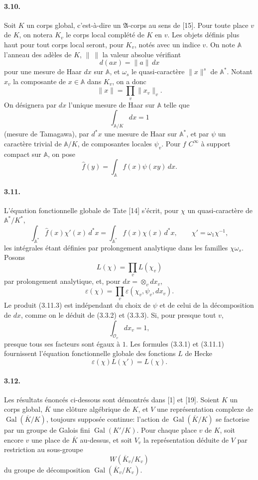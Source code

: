 \documentclass[10pt]{article}
\newcommand{\Gal}{\operatorname{Gal}}
\begin{document}
\paragraph{3.10.} Soit \(K\) un corps global, c'est-à-dire un \(\mathfrak A\)-corps au sens de [15]. Pour toute place \(v\) de \(K\), on notera \(K_v\) le corps local complété de \(K\) en \(v\). Les objets définis plus haut pour tout corps local seront, pour \(K_v\), notés avec un indice \(v\). On note \(\mathbb A\) l'anneau des adèles de \(K\), \(\|\ \|\) la valeur absolue vérifiant
\[
d(ax)=\|a\|\,dx
\]
pour une mesure de Haar \(dx\) sur \(\mathbb A\), et \(\omega_s\) le quasi-caractère \(\|x\|^s\) de \(\mathbb A^*\). Notant \(x_v\) la composante de \(x\in\mathbb A\) dans \(K_v\), on a donc
\[
\|x\|=\prod_v\|x_v\|_v.
\]
On désignera par \(dx\) l'unique mesure de Haar sur \(\mathbb A\) telle que
\[
\int_{\mathbb A/K}dx=1
\]
(mesure de Tamagawa), par \(d^*x\) une mesure de Haar sur \(\mathbb A^*\), et par \(\psi\) un caractère trivial de \(\mathbb A/K\), de composantes locales \(\psi_v\). Pour \(f\) \(C^\infty\) à support compact sur \(\mathbb A\), on pose
\[
\widehat f(y)=\int_{\mathbb A}f(x)\psi(xy)\,dx.
\]

\paragraph{3.11.} L'équation fonctionnelle globale de Tate [14] s'écrit, pour \(\chi\) un quasi-caractère de \(\mathbb A^*/K^*\),
\[
\tag{3.11.1}
\int_{\mathbb A^*}\widehat f(x)\chi'(x)\,d^*x
=
\int_{\mathbb A^*}f(x)\chi(x)\,d^*x,
\qquad
\chi'=\omega_1\chi^{-1},
\]
les intégrales étant définies par prolongement analytique dans les familles \(\chi\omega_s\). Posons
\[
\tag{3.11.2}
L(\chi)=\prod_v L(\chi_v)
\]
par prolongement analytique, et, pour \(dx=\otimes_v dx_v\),
\[
\tag{3.11.3}
\varepsilon(\chi)=\prod_v\varepsilon(\chi_v,\psi_v,dx_v).
\]
Le produit (3.11.3) est indépendant du choix de \(\psi\) et de celui de la décomposition de \(dx\), comme on le déduit de (3.3.2) et (3.3.3). Si, pour presque tout \(v\),
\[
\int_{\mathcal O_v}dx_v=1,
\]
presque tous ses facteurs sont égaux à \(1\). Les formules (3.3.1) et (3.11.1) fournissent l'équation fonctionnelle globale des fonctions \(L\) de Hecke
\[
\tag{3.11.4}
\varepsilon(\chi)L(\chi')=L(\chi).
\]

\paragraph{3.12.} Les résultats énoncés ci-dessous sont démontrés dans [1] et [19]. Soient \(K\) un corps global, \(\overline K\) une clôture algébrique de \(K\), et \(V\) une représentation complexe de \(\Gal(\overline K/K)\), toujours supposée continue: l'action de \(\Gal(\overline K/K)\) se factorise par un groupe de Galois fini \(\Gal(K'/K)\). Pour chaque place \(v\) de \(K\), soit encore \(v\) une place de \(\overline K\) au-dessus, et soit \(V_v\) la représentation déduite de \(V\) par restriction au sous-groupe
\[
W(\overline K_v/K_v)
\]
du groupe de décomposition \(\Gal(\overline K_v/K_v)\).
\end{document}

